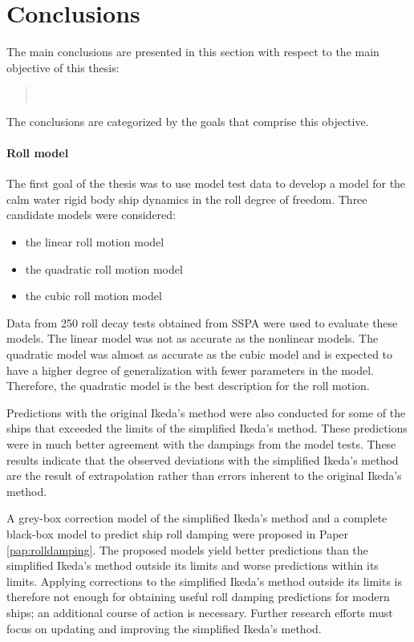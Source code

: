 \chapter{Conclusions\label{ch:conclusions}}
The main conclusions are presented in this section with respect to the main objective of this thesis:
\begin{quote} 
\vspace{0.1cm}
\objective \\
\vspace{-0.3cm}
\end{quote}
\noindent The conclusions are categorized by the goals that comprise this objective.

\subsubsection*{\normalfont \color{black} \textbf{Roll model}}
The first goal of the thesis was to use model test data to develop a model for the calm water rigid body ship dynamics in the roll degree of freedom. 
Three candidate models were considered: 
\begin{itemize}
    \item the linear roll motion model
    \item the quadratic roll motion model
    \item the cubic roll motion model
\end{itemize}
\noindent Data from 250 roll decay tests obtained from SSPA were used to evaluate these models. The linear model was not as accurate as the nonlinear models. The quadratic model was almost as accurate as the cubic model and is expected to have a higher degree of generalization with fewer parameters in the model. Therefore,  the quadratic model is the best description for the roll motion. 

Predictions with the original Ikeda's method were also conducted for some of the ships that exceeded the limits of the simplified Ikeda's method. These predictions were in much better agreement with the dampings from the model tests. These results indicate that the observed deviations with the simplified Ikeda's method are the result of extrapolation rather than errors inherent 
to the original Ikeda's method.

A grey-box correction model of the simplified Ikeda's method and a complete black-box model to predict ship roll damping were proposed in Paper \ref{pap:rolldamping}. The proposed models yield better predictions than the simplified Ikeda's method outside its limits and worse predictions within its limits. Applying corrections to the simplified Ikeda's method outside its limits is therefore not enough for obtaining useful roll damping predictions for modern ships; an additional course of action is necessary. Further research efforts must focus on updating and improving the simplified Ikeda's method.

